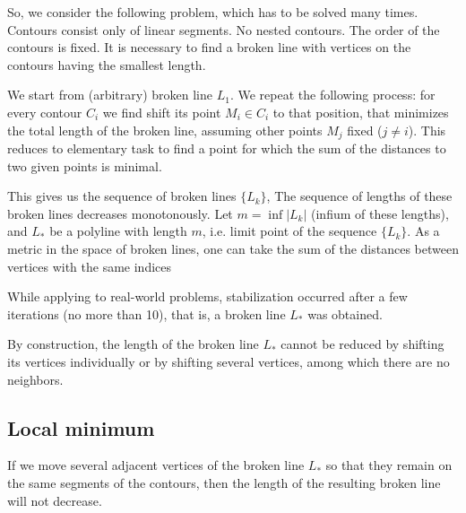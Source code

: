 \documentclass[]{llncs}
\begin{document}
So,
we consider the following problem,
which has to be solved many times.
Contours consist only of linear segments.
No nested contours.
The order of the contours is fixed.
It is necessary to find a broken line with vertices
on the contours
having the smallest length.

We start from
(arbitrary)
broken line
$L_1$.
We repeat the following process:
for every contour
$C_i$
we find shift its point
$M_i \in C_i$
to that position,
that minimizes the total
length of the broken line,
assuming other points
$M_j$ fixed
($j \ne i$).
This reduces to elementary task
to find a point for which
the sum of the distances to two given points is minimal.

This gives us
the sequence of broken lines
$\{L_k\}$,
The sequence of lengths of these broken lines
decreases monotonously.
Let
$m = \inf |L_k|$
(infium of these lengths),
and
$L_*$ be a polyline with length $m$,
i.e. limit point of the sequence
$\{L_k\}$.
As a metric in the space of broken lines,
one can take the sum of the distances
between vertices with the same indices

\begin{remark}
While applying to real-world problems,
stabilization occurred after a few iterations
(no more than 10),
that is, a broken line
$L_*$ was obtained.
\end{remark}

By construction,
the length of the broken line
$L_*$
cannot be reduced by shifting its vertices individually
or by shifting several vertices,
among which there are no neighbors.

\subsection{Local minimum}

\begin{proposition}
If we move several adjacent vertices of the broken line
$L_*$
so that they remain on the same segments of the contours,
then the length of the resulting broken line will not decrease.
\end{proposition}
\end{document}
